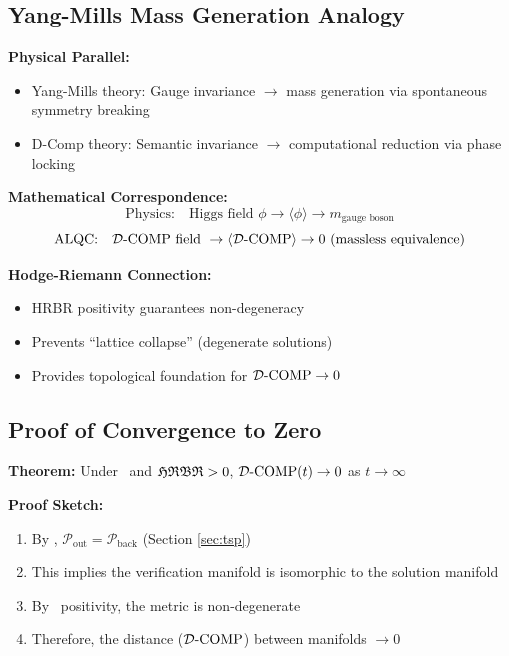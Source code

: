 \subsection{Yang-Mills Mass Generation Analogy}

\textbf{Physical Parallel:}
\begin{itemize}
    \item Yang-Mills theory: Gauge invariance $\to$ mass generation via spontaneous symmetry breaking
    \item D-Comp theory: Semantic invariance $\to$ computational reduction via phase locking
\end{itemize}

\textbf{Mathematical Correspondence:}
\begin{equation}
    \text{Physics:} \quad \text{Higgs field } \phi \to \langle \phi \rangle \to m_{\text{gauge boson}}
\end{equation}
\begin{equation}
    \text{ALQC:} \quad \mathcal{D}\text{-}\mathrm{COMP} \text{ field } \to \langle \mathcal{D}\text{-}\mathrm{COMP} \rangle \to 0 \text{ (massless equivalence)}
\end{equation}

\textbf{Hodge-Riemann Connection:}
\begin{itemize}
    \item HRBR positivity guarantees non-degeneracy
    \item Prevents ``lattice collapse'' (degenerate solutions)
    \item Provides topological foundation for $\mathcal{D}\text{-}\mathrm{COMP} \to 0$
\end{itemize}

\subsection{Proof of Convergence to Zero}

\textbf{Theorem:} Under \TSP\ and $\mathfrak{HRBR} > 0$, $\mathcal{D}\text{-}\mathrm{COMP}(t) \to 0$ as $t \to \infty$

\textbf{Proof Sketch:}
\begin{enumerate}
    \item By \TSP, $\mathcal{P}_{\text{out}} = \mathcal{P}_{\text{back}}$ (Section \ref{sec:tsp})
    \item This implies the verification manifold is isomorphic to the solution manifold
    \item By \HRBR\ positivity, the metric is non-degenerate
    \item Therefore, the distance ($\mathcal{D}\text{-}\mathrm{COMP}$) between manifolds $\to 0$
\end{enumerate}


